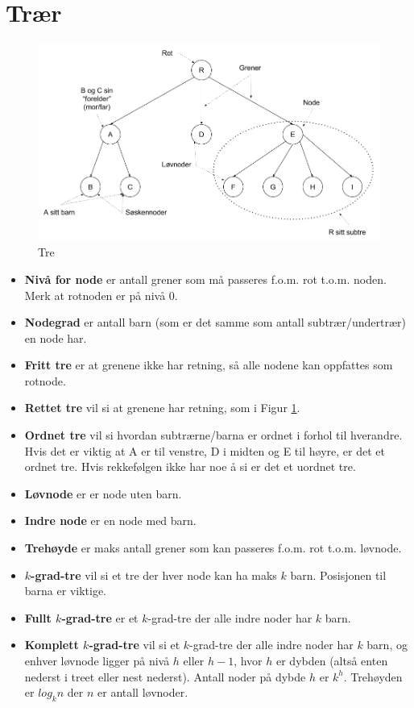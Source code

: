 \section{Trær}
\begin{figure}[H]
\includegraphics[scale=0.5]{images/traer}
\centering %
\caption{Tre}
\label{fig:trær}
\end{figure}

\begin{itemize}
    \item \textbf{Nivå for node} er antall grener som må passeres f.o.m. rot t.o.m. noden. Merk at rotnoden er på nivå 0.
    \item \textbf{Nodegrad} er antall barn (som er det samme som antall subtrær/undertrær) en node har.
    \item \textbf{Fritt tre} er at grenene ikke har retning, så alle nodene kan oppfattes som rotnode.
    \item \textbf{Rettet tre} vil si at grenene har retning, som i Figur \ref{fig:trær}.
    \item \textbf{Ordnet tre} vil si hvordan subtrærne/barna er ordnet i forhol til hverandre. Hvis det er viktig at A er til venstre, D i midten og E til høyre, er det et ordnet tre. Hvis rekkefølgen ikke har noe å si er det et uordnet tre.
    \item \textbf{Løvnode} er er node uten barn.
    \item \textbf{Indre node} er en node med barn.
    \item \textbf{Trehøyde} er maks antall grener som kan passeres f.o.m. rot t.o.m. løvnode.
    \item \textbf{$k$-grad-tre} vil si et tre der hver node kan ha maks $k$ barn. Posisjonen til barna er viktige.
    \item \textbf{Fullt $k$-grad-tre} er et $k$-grad-tre der alle indre noder har $k$ barn.
    \item \textbf{Komplett $k$-grad-tre} vil si et $k$-grad-tre der alle indre noder har $k$ barn, og enhver løvnode ligger på nivå $h$ eller $h - 1$, hvor $h$ er dybden (altså enten nederst i treet eller nest nederst). Antall noder på dybde $h$ er $k^h$. Trehøyden er $log_k n$ der $n$ er antall løvnoder.
\end{itemize}

